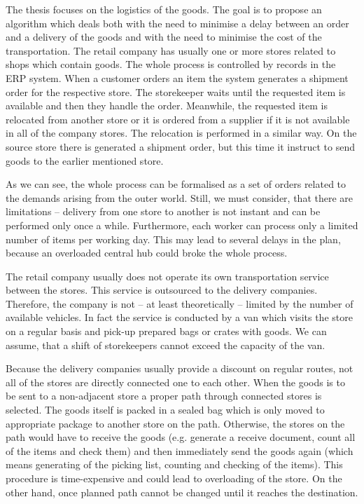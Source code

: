 The thesis focuses on the logistics of the goods. The goal is to propose an algorithm which deals both with the need to minimise a delay between an order and a delivery 
of the goods and with the need to minimise the cost of the transportation. The retail company has usually one or more stores related to shops which contain goods.
The whole process is controlled by records in the ERP system. When a customer orders an item the system generates a shipment order for the respective store.
The storekeeper waits until the requested item is available and then they handle the order. Meanwhile, the requested item is relocated from another store or it is ordered from 
a supplier if it is not available in all of the company stores. The relocation is performed in a similar way. On the source store there is generated a shipment order, but this time
it instruct to send goods to the earlier mentioned store.

As we can see, the whole process can be formalised as a set of orders related to the demands arising from the outer world. Still, we must consider, that there are limitations -- 
delivery from one store to another is not instant and can be performed only once a while. Furthermore, each worker can process only a limited number of items per working day.
This may lead to several delays in the plan, because an overloaded central hub could broke the whole process.

The retail company usually does not operate its own transportation service between the stores. This service is outsourced to the delivery companies. Therefore, the company is not -- at least
theoretically -- limited by the number of available vehicles. In fact the service is conducted by a van which visits the store on a regular basis and pick-up prepared bags or crates with goods.
We can assume, that a shift of storekeepers cannot exceed the capacity of the van.

Because the delivery companies usually provide a discount on regular routes, not all of the stores are directly connected one to each other. When the goods is to be sent to a non-adjacent store
a proper path through connected stores is selected. The goods itself is packed in a sealed bag which is only moved to appropriate package to another store on the path. Otherwise, the stores
on the path would have to receive the goods (e.g. generate a receive document, count all of the items and check them) and then immediately send the goods again (which means generating of the 
picking list, counting and checking of the items). This procedure is time-expensive and could lead to overloading of the store. On the other hand, once planned path cannot be changed until 
it reaches the destination.


